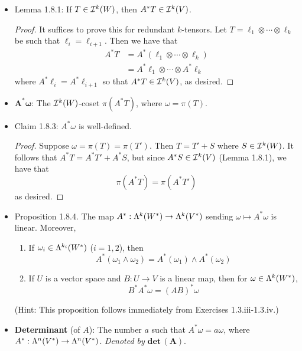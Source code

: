 \documentclass[../notes.tex]{subfiles}
\begin{document}
\begin{itemize}
    \item Lemma 1.8.1: If $T\in\ide[k]{W}$, then $A^*T\in\ide[k]{V}$.
    \begin{proof}
        It suffices to prove this for redundant $k$-tensors. Let $T=\ell_1\otimes\cdots\otimes\ell_k$ be such that $\ell_i=\ell_{i+1}$. Then we have that
        \begin{align*}
            A^*T &= A^*(\ell_1\otimes\cdots\otimes\ell_k)\\
            &= A^*\ell_1\otimes\cdots\otimes A^*\ell_k\tag*{Exercise 1.3.iii}
        \end{align*}
        where $A^*\ell_i=A^*\ell_{i+1}$ so that $A^*T\in\ide[k]{V}$, as desired.
    \end{proof}
    \item $\bm{A^*\omega}$: The $\ide[k]{W}$-coset $\pi(A^*T)$, where $\omega=\pi(T)$.
    \item Claim 1.8.3: $A^*\omega$ is well-defined.
    \begin{proof}
        Suppose $\omega=\pi(T)=\pi(T')$. Then $T=T'+S$ where $S\in\ide[k]{W}$. It follows that $A^*T=A^*T'+A^*S$, but since $A^*S\in\ide[k]{V}$ (Lemma 1.8.1), we have that
        \begin{equation*}
            \pi(A^*T) = \pi(A^*T')
        \end{equation*}
        as desired.
    \end{proof}
    \item Proposition 1.8.4. The map $A^*:\lam[k]{W^*}\to\lam[k]{V^*}$ sending $\omega\mapsto A^*\omega$ is linear. Moreover,
    \begin{enumerate}
        \item If $\omega_i\in\lam[k_i]{W^*}$ ($i=1,2$), then
        \begin{equation*}
            A^*(\omega_1\wedge\omega_2) = A^*(\omega_1)\wedge A^*(\omega_2)
        \end{equation*}
        \item If $U$ is a vector space and $B:U\to V$ is a linear map, then for $\omega\in\lam[k]{W^*}$,
        \begin{equation*}
            B^*A^*\omega = (AB)^*\omega
        \end{equation*}
    \end{enumerate}
    (Hint: This proposition follows immediately from Exercises 1.3.iii-1.3.iv.)
    \item \textbf{Determinant} (of $A$): The number $a$ such that $A^*\omega=a\omega$, where $A^*:\lam[n]{V^*}\to\lam[n]{V^*}$. \emph{Denoted by} $\textbf{det}\,\bm{(A)}$.

\end{itemize}
\end{document}
